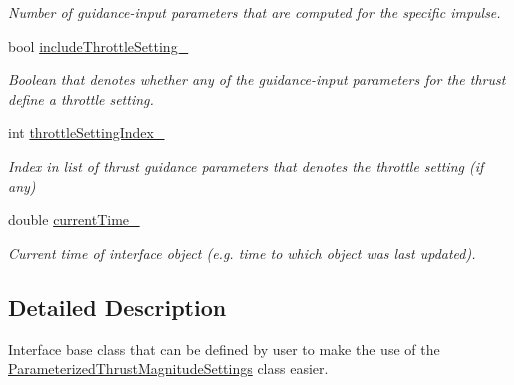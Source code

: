 \begin{DoxyCompactItemize}
\begin{DoxyCompactList}\small\item\em Number of guidance-\/input parameters that are computed for the specific impulse. \end{DoxyCompactList}\item 
bool \hyperlink{classtudat_1_1simulation__setup_1_1ThrustInputParameterGuidance_aead2156f19faafac97b1a2e8b76492fd}{include\+Throttle\+Setting\+\_\+}\hypertarget{classtudat_1_1simulation__setup_1_1ThrustInputParameterGuidance_aead2156f19faafac97b1a2e8b76492fd}{}\label{classtudat_1_1simulation__setup_1_1ThrustInputParameterGuidance_aead2156f19faafac97b1a2e8b76492fd}

\begin{DoxyCompactList}\small\item\em Boolean that denotes whether any of the guidance-\/input parameters for the thrust define a throttle setting. \end{DoxyCompactList}\item 
int \hyperlink{classtudat_1_1simulation__setup_1_1ThrustInputParameterGuidance_a953ac5f083df77b65d18f5c5cc5a1d77}{throttle\+Setting\+Index\+\_\+}\hypertarget{classtudat_1_1simulation__setup_1_1ThrustInputParameterGuidance_a953ac5f083df77b65d18f5c5cc5a1d77}{}\label{classtudat_1_1simulation__setup_1_1ThrustInputParameterGuidance_a953ac5f083df77b65d18f5c5cc5a1d77}

\begin{DoxyCompactList}\small\item\em Index in list of thrust guidance parameters that denotes the throttle setting (if any) \end{DoxyCompactList}\item 
double \hyperlink{classtudat_1_1simulation__setup_1_1ThrustInputParameterGuidance_ad4cee947b4c3447fc2e125c0c6440cc0}{current\+Time\+\_\+}\hypertarget{classtudat_1_1simulation__setup_1_1ThrustInputParameterGuidance_ad4cee947b4c3447fc2e125c0c6440cc0}{}\label{classtudat_1_1simulation__setup_1_1ThrustInputParameterGuidance_ad4cee947b4c3447fc2e125c0c6440cc0}

\begin{DoxyCompactList}\small\item\em Current time of interface object (e.\+g. time to which object was last updated). \end{DoxyCompactList}\end{DoxyCompactItemize}


\subsection{Detailed Description}
Interface base class that can be defined by user to make the use of the \hyperlink{classtudat_1_1simulation__setup_1_1ParameterizedThrustMagnitudeSettings}{Parameterized\+Thrust\+Magnitude\+Settings} class easier. 

